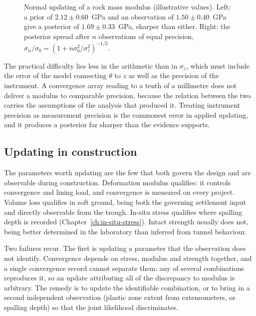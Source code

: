 \begin{figure}[htbp]
\centering
{}
\caption{Normal updating of a rock mass modulus (illustrative values). Left: a prior of $2.12 \pm 0.60$~GPa and an observation of $1.50 \pm 0.40$~GPa give a posterior of $1.69 \pm 0.33$~GPa, sharper than either. Right: the posterior spread after $n$ observations of equal precision, $\sigma_n/\sigma_0 = (1 + n\sigma_0^2/\sigma_z^2)^{-1/2}$.}
\label{fig:bayesian-update}
\end{figure}

The practical difficulty lies less in the arithmetic than in $\sigma_z$, which
must include the error of the model connecting $\theta$ to $z$ as well as the
precision of the instrument. A convergence array reading to a tenth of a
millimetre does not deliver a modulus to comparable precision, because the
relation between the two carries the assumptions of the analysis that
produced it. Treating instrument precision as measurement precision is the
commonest error in applied updating, and it produces a posterior far sharper
than the evidence supports.

\subsection{Updating in construction}
\label{sec:updating-in-construction}

The parameters worth updating are the few that both govern the
design and are observable during construction. Deformation modulus qualifies:
it controls convergence and lining load, and convergence is measured on every
project. Volume loss qualifies in soft ground, being both the governing
settlement input and directly observable from the trough. In-situ stress
qualifies where spalling depth is recorded
(Chapter~\ref{ch:in-situ-stress}). Intact strength usually does not, being
better determined in the laboratory than inferred from tunnel behaviour.

Two failures recur. The first is updating a parameter that the observation
does not identify. Convergence depends on stress, modulus and strength
together, and a single convergence record cannot separate them: any of several
combinations reproduces it, so an update attributing all of the discrepancy to
modulus is arbitrary. The remedy is to update the identifiable combination, or
to bring in a second independent observation (plastic zone extent from
extensometers, or spalling depth) so that the joint likelihood
discriminates.

